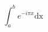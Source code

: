 \documentclass[leterpaper, 10pt]{article}
\begin{document}
\begin{equation}
    \int_{a}^{b} e^{-i\pi x} \mathrm{dx}
\end{equation}
\end{document}
